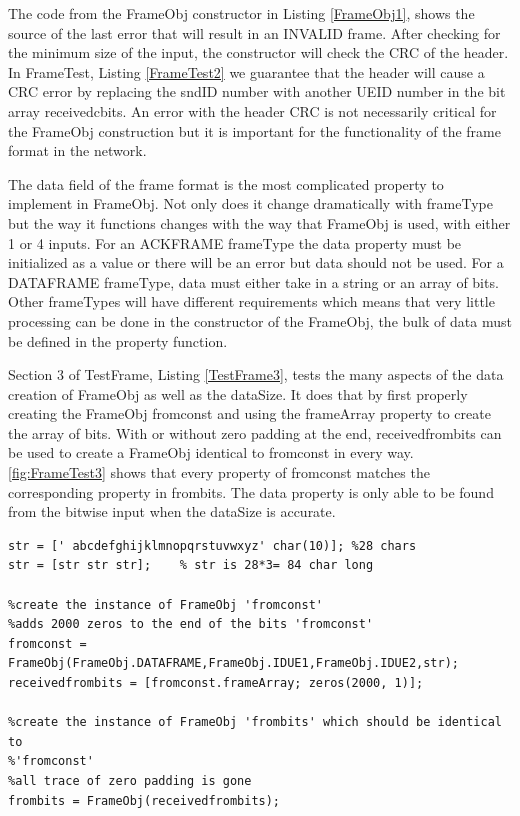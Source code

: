 The code from the FrameObj constructor in Listing \ref{FrameObj1}, shows the source of the last error that will result in an INVALID frame. After checking for the minimum size of the input, the constructor will check the CRC of the header. In FrameTest, Listing \ref{FrameTest2} we guarantee that the header will cause a CRC error by replacing the sndID number with another UEID number in the bit array receivedcbits. An error with the header CRC is not necessarily critical for the FrameObj construction but it is important for the functionality of the frame format in the network.

The data field of the frame format is the most complicated property to implement in FrameObj. Not only does it change dramatically with frameType but the way it functions changes with the way that FrameObj is used, with either 1 or 4 inputs. For an ACKFRAME frameType the data property must be initialized as a value or there will be an error but data should not be used. For a DATAFRAME frameType, data must either take in a string or an array of bits. Other frameTypes will have different requirements which means that very little processing can be done in the constructor of the FrameObj, the bulk of data must be defined in the property function. 

Section 3 of TestFrame, Listing \ref{TestFrame3}, tests the many aspects of the data creation of FrameObj as well as the dataSize. It does that by first properly creating the FrameObj fromconst and using the frameArray property to create the array of bits. With or without zero padding at the end, receivedfrombits can be used to create a FrameObj identical to fromconst in every way. \ref{fig:FrameTest3} shows that every property of fromconst matches the corresponding property in frombits. The data property is only able to be found from the bitwise input when the dataSize is accurate.   

\begin{lstlisting} 
str = [' abcdefghijklmnopqrstuvwxyz' char(10)]; %28 chars
str = [str str str];    % str is 28*3= 84 char long

%create the instance of FrameObj 'fromconst'
%adds 2000 zeros to the end of the bits 'fromconst'
fromconst = FrameObj(FrameObj.DATAFRAME,FrameObj.IDUE1,FrameObj.IDUE2,str);
receivedfrombits = [fromconst.frameArray; zeros(2000, 1)];

%create the instance of FrameObj 'frombits' which should be identical to
%'fromconst' 
%all trace of zero padding is gone
frombits = FrameObj(receivedfrombits);
\end{lstlisting} 

